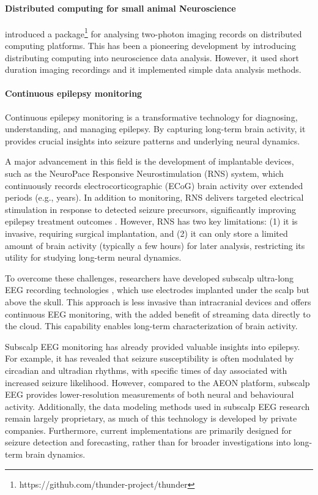 \documentclass[12pt]{article}
\begin{document}
\paragraph{Distributed computing for small animal Neuroscience}
%
\citet{freemanEtAl14} introduced a
package\footnote{https://github.com/thunder-project/thunder} for analysing
two-photon imaging records on distributed computing platforms.  This has been a
pioneering development by introducing distributing computing into neuroscience
data analysis. However, it used short duration imaging recordings and it
implemented simple data analysis methods.

\paragraph{Continuous epilepsy monitoring}
%
Continuous epilepsy monitoring is a transformative technology for diagnosing,
understanding, and managing epilepsy. By capturing long-term brain activity, it
provides crucial insights into seizure patterns and underlying neural dynamics.

A major advancement in this field is the development of implantable devices,
such as the NeuroPace Responsive Neurostimulation (RNS) system, which
continuously records electrocorticographic (ECoG) brain activity over extended
periods (e.g., years). In addition to monitoring, RNS delivers targeted
electrical stimulation in response to detected seizure precursors,
significantly improving epilepsy treatment outcomes \citep{rao21}. However, RNS
has two key limitations: (1) it is invasive, requiring surgical implantation,
and (2) it can only store a limited amount of brain activity (typically a few
hours) for later analysis, restricting its utility for studying long-term
neural dynamics.

To overcome these challenges, researchers have developed subscalp ultra-long
EEG recording technologies \citep{duunHenriksenEtAl20}, which use electrodes
implanted under the scalp but above the skull. This approach is less invasive
than intracranial devices and offers continuous EEG monitoring, with the added
benefit of streaming data directly to the cloud. This capability enables
long-term characterization of brain activity.

Subscalp EEG monitoring has already provided valuable insights into epilepsy.
For example, it has revealed that seizure susceptibility is often modulated by
circadian and ultradian rhythms, with specific times of day associated with
increased seizure likelihood. However, compared to the AEON platform, subscalp
EEG provides lower-resolution measurements of both neural and behavioural
activity. Additionally, the data modeling methods used in subscalp EEG research
remain largely proprietary, as much of this technology is developed by private
companies. Furthermore, current implementations are primarily designed for
seizure detection and forecasting, rather than for broader investigations into
long-term brain dynamics.
\end{document}
